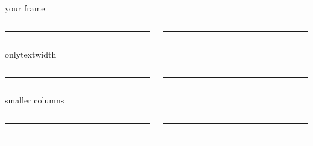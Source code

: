\documentclass{beamer}
\begin{document}
\begin{frame}{your frame}
    \begin{columns}[t]
        \begin{column}{0.5\textwidth}
            \rule{\textwidth}{3cm}
        \end{column}
        \vrule{}
        \begin{column}{0.5\textwidth}
            \rule{\textwidth}{3cm}
        \end{column}
    \end{columns}
\end{frame}


\begin{frame}{onlytextwidth}
    \begin{columns}[t, onlytextwidth]
        \begin{column}{0.5\textwidth}
            \rule{\textwidth}{3cm}
        \end{column}
        \vrule{}
        \begin{column}{0.5\textwidth}
            \rule{\textwidth}{3cm}
        \end{column}
    \end{columns}
\end{frame}

\begin{frame}{smaller columns}
    \begin{columns}[t]
        \begin{column}{0.45\textwidth}
            \rule{\textwidth}{3cm}
        \end{column}
        \vrule{}
        \begin{column}{0.45\textwidth}
            \rule{\textwidth}{3cm}
        \end{column}
    \end{columns}
\end{frame}

\begin{frame}
    \rule{\textwidth}{3cm}
\end{frame}
\end{document}
